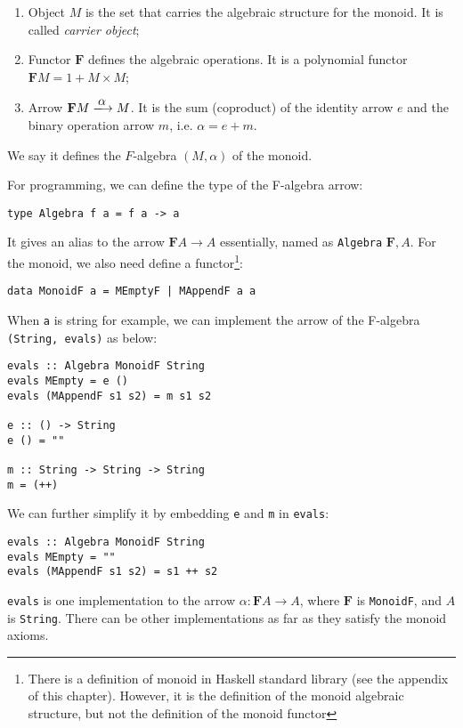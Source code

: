 \documentclass{article}
\begin{document}
\begin{example}
\begin{enumerate}
  \item Object $M$ is the set that carries the algebraic structure for the monoid. It is called {\em carrier object};
  \item Functor $\mathbf{F}$ defines the algebraic operations. It is a polynomial functor $\mathbf{F} M = 1 + M \times M$;
  \item Arrow $\mathbf{F} M \arrowto{\alpha} M$. It is the sum (coproduct) of the identity arrow $e$ and the binary operation arrow $m$, i.e. $\alpha = e + m$.
\end{enumerate}

We say it defines the $F$-algebra $(M, \alpha)$ of the monoid.

For programming, we can define the type of the F-algebra arrow:

\begin{lstlisting}
type Algebra f a = f a -> a
\end{lstlisting}

It gives an alias to the arrow $\mathbf{F}A \to A$ essentially, named as \texttt{Algebra} $\mathbf{F}, A$. For the monoid, we also need define a functor\footnote{There is a definition of monoid in Haskell standard library (see the appendix of this chapter). However, it is the definition of the monoid algebraic structure, but not the definition of the monoid functor}:

\begin{lstlisting}
data MonoidF a = MEmptyF | MAppendF a a
\end{lstlisting}

When \texttt{a} is string for example, we can implement the arrow of the F-algebra \texttt{(String, evals)} as below:

\begin{lstlisting}
evals :: Algebra MonoidF String
evals MEmpty = e ()
evals (MAppendF s1 s2) = m s1 s2

e :: () -> String
e () = ""

m :: String -> String -> String
m = (++)
\end{lstlisting}

We can further simplify it by embedding \texttt{e} and \texttt{m} in \texttt{evals}:

\begin{lstlisting}
evals :: Algebra MonoidF String
evals MEmpty = ""
evals (MAppendF s1 s2) = s1 ++ s2
\end{lstlisting}

\texttt{evals} is one implementation to the arrow $\alpha : \mathbf{F}A \to A$, where $\mathbf{F}$ is \texttt{MonoidF}, and $A$ is \texttt{String}. There can be other implementations as far as they satisfy the monoid axioms.
\end{example}
\end{document}
